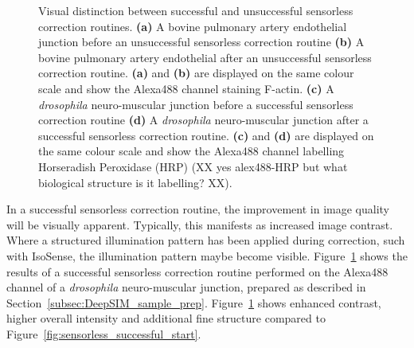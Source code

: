 \begin{figure}[h]
\begin{subfigure}{0.48\textwidth}
		\caption{}
		\label{fig:sensorless_successful_end}
	\end{subfigure}
	\caption[Visual distinction between unsuccessful and
          successful sensorless correction routines]{Visual
          distinction between successful and unsuccessful sensorless
          correction routines. \textbf{(a)} A bovine pulmonary artery
          endothelial junction before an unsuccessful sensorless
          correction routine \textbf{(b)} A bovine pulmonary artery
          endothelial after an unsuccessful sensorless correction
          routine. \textbf{(a)} and \textbf{(b)} are displayed on the
          same colour scale and show the Alexa488 channel staining
          F-actin. \textbf{(c)} A \textit{drosophila} neuro-muscular
          junction before a successful sensorless correction routine
          \textbf{(d)} A \textit{drosophila} neuro-muscular junction
          after a successful sensorless correction
          routine. \textbf{(c)} and \textbf{(d)} are displayed on the
          same colour scale and show the Alexa488 channel labelling
          Horseradish Peroxidase (HRP) (XX yes alex488-HRP but what
          biological structure is it labelling? XX).}
	\label{fig:sensorless_routine_success_failure}
\end{figure}

In a successful sensorless correction routine, the improvement in image 
quality will be visually apparent. Typically, this manifests as increased 
image contrast. Where a structured illumination pattern has been applied 
during correction, such with IsoSense, the illumination pattern maybe become 
visible. Figure~\ref{fig:sensorless_successful_end} shows the results of a 
successful sensorless correction routine performed on the Alexa488 channel of 
a \textit{drosophila} neuro-muscular junction, prepared as described in 
Section~\ref{subsec:DeepSIM_sample_prep}. 
Figure~\ref{fig:sensorless_successful_end} shows enhanced contrast, higher 
overall intensity and additional fine structure compared to 
Figure~\ref{fig:sensorless_successful_start}.
